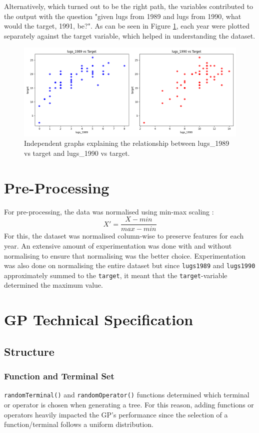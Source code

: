 \documentclass{article}
\begin{document}
Alternatively, which turned out to be the right path, the variables contributed to the output with the question "given lugs from 1989 and lugs from 1990, what would the target, 1991, be?". As can be seen in Figure \ref{fig:independent}, each year were plotted separately against the target variable, which helped in understanding the dataset.

\begin{figure}[H]
  \includegraphics[width=\linewidth]{lugs vs target.png}
  \caption{Independent graphs explaining the relationship between lugs\_1989 vs target and lugs\_1990 vs target.}
  \label{fig:independent}
\end{figure}

\section{Pre-Processing}
For pre-processing, the data was normalised using min-max scaling \cite{patro_2015_normalization}:
\begin{equation}\label{norm}
  X' = \frac{X-min}{max-min}
\end{equation}
For this, the dataset was normalised column-wise to preserve features for each year. An extensive amount of experimentation was done with and without normalising to ensure that normalising was the better choice.
Experimentation was also done on normalising the entire dataset but since \texttt{lugs1989} and \texttt{lugs1990} approximately summed to the \texttt{target}, it meant that the \texttt{target}-variable determined the maximum value.

\section{GP Technical Specification}
\subsection{Structure}
\subsubsection{Function and Terminal Set}
\texttt{randomTerminal()} and \texttt{randomOperator()} functions determined which terminal or operator is chosen when generating a tree. For this reason, adding functions or operators heavily impacted the GP's performance since the selection of a function/terminal follows a uniform distribution.
\end{document}
